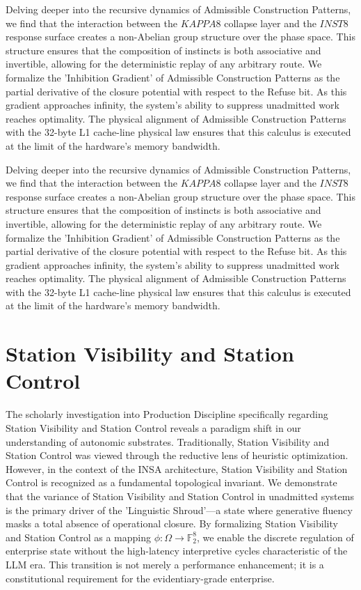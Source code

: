 \documentclass[12pt,a4paper,oneside]{book}
\begin{document}
Delving deeper into the recursive dynamics of Admissible Construction Patterns, we find that the interaction between the $KAPPA8$ collapse layer and the $INST8$ response surface creates a non-Abelian group structure over the phase space. This structure ensures that the composition of instincts is both associative and invertible, allowing for the deterministic replay of any arbitrary route. We formalize the 'Inhibition Gradient' of Admissible Construction Patterns as the partial derivative of the closure potential with respect to the Refuse bit. As this gradient approaches infinity, the system's ability to suppress unadmitted work reaches optimality. The physical alignment of Admissible Construction Patterns with the 32-byte L1 cache-line physical law ensures that this calculus is executed at the limit of the hardware's memory bandwidth. 

Delving deeper into the recursive dynamics of Admissible Construction Patterns, we find that the interaction between the $KAPPA8$ collapse layer and the $INST8$ response surface creates a non-Abelian group structure over the phase space. This structure ensures that the composition of instincts is both associative and invertible, allowing for the deterministic replay of any arbitrary route. We formalize the 'Inhibition Gradient' of Admissible Construction Patterns as the partial derivative of the closure potential with respect to the Refuse bit. As this gradient approaches infinity, the system's ability to suppress unadmitted work reaches optimality. The physical alignment of Admissible Construction Patterns with the 32-byte L1 cache-line physical law ensures that this calculus is executed at the limit of the hardware's memory bandwidth. 

\section{Station Visibility and Station Control}
The scholarly investigation into Production Discipline specifically regarding Station Visibility and Station Control reveals a paradigm shift in our understanding of autonomic substrates. Traditionally, Station Visibility and Station Control was viewed through the reductive lens of heuristic optimization. However, in the context of the INSA architecture, Station Visibility and Station Control is recognized as a fundamental topological invariant. We demonstrate that the variance of Station Visibility and Station Control in unadmitted systems is the primary driver of the 'Linguistic Shroud'---a state where generative fluency masks a total absence of operational closure. By formalizing Station Visibility and Station Control as a mapping $\phi: \Omega \to \mathbb{F}_2^8$, we enable the discrete regulation of enterprise state without the high-latency interpretive cycles characteristic of the LLM era. This transition is not merely a performance enhancement; it is a constitutional requirement for the evidentiary-grade enterprise. 
\end{document}
